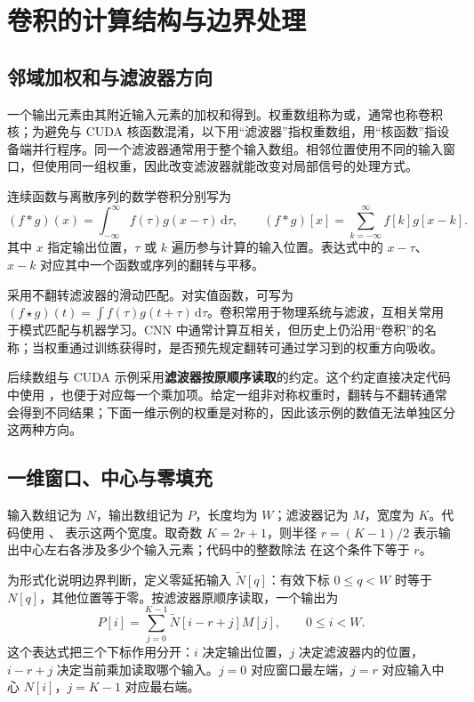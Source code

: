 \section{卷积的计算结构与边界处理}
\label{l8:sec:convolution}
\subsection{邻域加权和与滤波器方向}
一个输出元素由其附近输入元素的加权和得到。权重数组称为或，通常也称卷积核；为避免与 CUDA 核函数混淆，以下用“滤波器”指权重数组，用“核函数”指设备端并行程序。同一个滤波器通常用于整个输入数组。相邻位置使用不同的输入窗口，但使用同一组权重，因此改变滤波器就能改变对局部信号的处理方式。

连续函数与离散序列的数学卷积分别写为
\begin{equation}
 (f*g)(x)=\int_{-\infty}^{\infty} f(\tau)g(x-\tau)\,\mathrm d\tau,
 \qquad
 (f*g)[x]=\sum_{k=-\infty}^{\infty} f[k]g[x-k].
\end{equation}
其中 $x$ 指定输出位置，$\tau$ 或 $k$ 遍历参与计算的输入位置。表达式中的 $x-\tau$、$x-k$ 对应其中一个函数或序列的翻转与平移。

采用不翻转滤波器的滑动匹配。对实值函数，可写为 $(f\star g)(t)=\int f(\tau)g(t+\tau)\,\mathrm d\tau$。卷积常用于物理系统与滤波，互相关常用于模式匹配与机器学习。CNN 中通常计算互相关，但历史上仍沿用“卷积”的名称；当权重通过训练获得时，是否预先规定翻转可通过学习到的权重方向吸收。

后续数组与 CUDA 示例采用\textbf{滤波器按原顺序读取}的约定。这个约定直接决定代码中使用 ，也便于对应每一个乘加项。给定一组非对称权重时，翻转与不翻转通常会得到不同结果；下面一维示例的权重是对称的，因此该示例的数值无法单独区分这两种方向。

\subsection{一维窗口、中心与零填充}
输入数组记为 $N$，输出数组记为 $P$，长度均为 $W$；滤波器记为 $M$，宽度为 $K$。代码使用 \mbox{}、\mbox{} 表示这两个宽度。取奇数 $K=2r+1$，则半径 $r=(K-1)/2$ 表示输出中心左右各涉及多少个输入元素；代码中的整数除法  在这个条件下等于 $r$。

为形式化说明边界判断，定义零延拓输入 $\widetilde N[q]$：有效下标 $0\le q<W$ 时等于 $N[q]$，其他位置等于零。按滤波器原顺序读取，一个输出为
\begin{equation}
\boxed{\quad P[i]=\sum_{j=0}^{K-1}\widetilde N[i-r+j]M[j],\qquad 0\le i<W.\quad}
\label{l8:eq:1d}
\end{equation}
这个表达式把三个下标作用分开：$i$ 决定输出位置，$j$ 决定滤波器内的位置，$i-r+j$ 决定当前乘加读取哪个输入。$j=0$ 对应窗口最左端，$j=r$ 对应输入中心 $N[i]$，$j=K-1$ 对应最右端。

